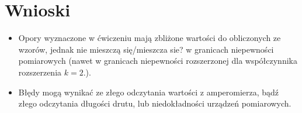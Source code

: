 \documentclass[a4paper,11pt]{article}
\begin{document}
\section{Wnioski}
\begin{itemize} 
\item Opory wyznaczone w ćwiczeniu mają zbliżone wartości do obliczonych ze wzorów, jednak nie mieszczą się/mieszcza sie? w granicach niepewności pomiarowych (nawet w granicach niepewności rozszerzonej dla współczynnika rozszerzenia $k=2$.).
\item Błędy mogą wynikać ze złego odczytania wartości z amperomierza, bądź złego odczytania długości drutu, lub niedokładności urządzeń pomiarowych.
 
\end{itemize}
\end{document}
